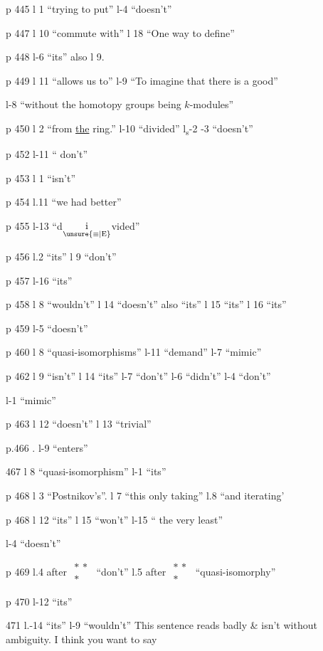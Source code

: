 p 445 l 1 ``trying to put'' \quad l-4 ``doesn't''

p 447 l 10 ``commute with'' \quad l 18 ``One way to define'' \quad {}

p 448 l-6 ``its'' also l 9.

p 449 l 11 ``allows  us to'' \quad l-9 ``To imagine that there is a good''

l-8 ``without the homotopy groups being $k$-modules''

p 450 l 2 ``from \uline{the} ring.'' \quad l-10 ``divided'' \quad l\textsubscript{s}-2  -3 ``doesn't''

p 452 l-11 `` don't''

p 453 l 1 ``isn't''

p 454 l.11 ``we had better''

p 455 l-13 ``d$\underset{\unsure{\equiv|\mathrm{E}}}{\text{i}}$vided''

p 456 l.2 ``its'' \quad l 9 ``don't''

p 457 l-16 ``its''

p 458 l 8 ``wouldn't'' \quad l 14 ``doesn't'' also ``its'' \quad l 15 ``its'' \quad l 16 ``its''

p 459 l-5 ``doesn't''

p 460 l 8 ``quasi-isomorphisms'' \quad l-11 ``demand'' \quad l-7 ``mimic''

p 462 l 9 ``isn't'' \quad l 14 ``its'' \quad l-7 ``don't'' \quad l-6 ``didn't'' \quad l-4 ``don't''

l-1 ``mimic''

p 463 l 12 ``doesn't'' \quad l 13 ``trivial''

p.466 . l-9 ``enters''

467 l 8 ``quasi-isomorphism'' \quad l-1 ``its''

p 468 l 3 ``Postnikov's''. \quad l 7 ``this only taking'' \quad l.8 ``and iterating'

p 468 l 12 ``its'' \quad l 15 ``won't'' \quad l-15 `` the very least''

l-4 ``doesn't''

p 469 l.4 after $\substack{\ast\,\ast\\ \ast}$ ``don't'' \quad l.5 after $\substack{\ast\,\ast\\ \ast}$ ``quasi-isomorphy''

p 470 l-12 ``its''

471 l.-14 ``its'' \quad l-9 ``wouldn't'' This sentence reads  badly  \& isn't without ambiguity. I think you want to say

